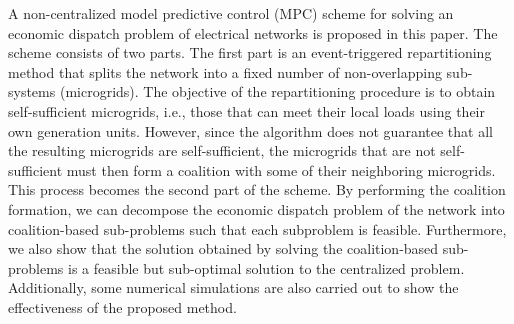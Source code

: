 A non-centralized model predictive control (MPC) scheme for solving an economic dispatch problem of electrical networks is proposed in this paper. The scheme consists of two parts. The first part is an event-triggered repartitioning method that splits the network into a fixed number of non-overlapping sub-systems {(microgrids)}. The objective of the repartitioning procedure is to obtain self-sufficient microgrids, i.e., those that can meet their local loads using their own generation units. However, since the algorithm does not guarantee that all the resulting microgrids are self-sufficient, the microgrids that are not self-sufficient must then form a coalition with some of their neighboring microgrids. This process becomes the second part of the scheme. By performing the coalition formation, we can decompose the economic dispatch problem of the network into coalition-based sub-problems such that each subproblem is feasible. Furthermore, we also show that the solution obtained by solving the coalition-based sub-problems is a feasible but sub-optimal solution to the centralized problem. Additionally, some numerical simulations are also carried out to show the effectiveness of the proposed method.  